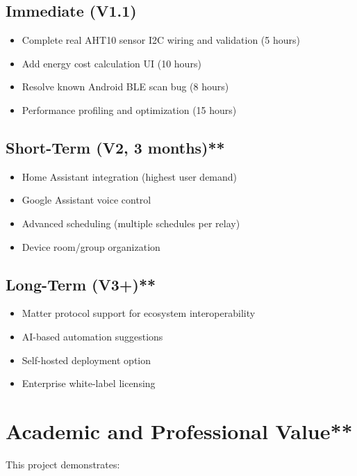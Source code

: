 \subsection{Immediate (V1.1)}

\begin{itemize}
    \item Complete real AHT10 sensor I2C wiring and validation (5 hours)
    \item Add energy cost calculation UI (10 hours)
    \item Resolve known Android BLE scan bug (8 hours)
    \item Performance profiling and optimization (15 hours)
\end{itemize}

\subsection{Short-Term (V2, 3 months)**}

\begin{itemize}
    \item Home Assistant integration (highest user demand)
    \item Google Assistant voice control
    \item Advanced scheduling (multiple schedules per relay)
    \item Device room/group organization
\end{itemize}

\subsection{Long-Term (V3+)**}

\begin{itemize}
    \item Matter protocol support for ecosystem interoperability
    \item AI-based automation suggestions
    \item Self-hosted deployment option
    \item Enterprise white-label licensing
\end{itemize}

\section{Academic and Professional Value**}

This project demonstrates:


